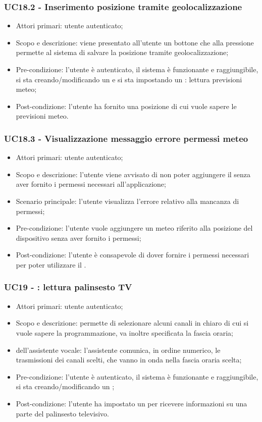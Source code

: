 \subsubsection{UC18.2 - Inserimento posizione tramite geolocalizzazione}
\begin{itemize}
	\item  Attori primari: utente autenticato;
	\item  Scopo e descrizione: viene presentato all'utente un bottone che alla pressione permette al sistema di salvare la posizione tramite geolocalizzazione;
	\item  Pre-condizione: l'utente è autenticato, il sistema è funzionante e raggiungibile, si sta creando/modificando un  e si sta impostando un : lettura previsioni meteo;
	\item  Post-condizione: l'utente ha fornito una posizione di cui vuole sapere le previsioni meteo.
\end{itemize}
\subsubsection{UC18.3 - Visualizzazione messaggio errore permessi meteo}
\begin{itemize}
	\item  Attori primari: utente autenticato;
	\item  Scopo e descrizione: l'utente viene avvisato di non poter aggiungere il  senza aver fornito i permessi necessari all'applicazione;
	\item  Scenario principale: l'utente visualizza l'errore relativo alla mancanza di permessi;
	\item  Pre-condizione: l'utente vuole aggiungere un  meteo riferito alla posizione del dispositivo  senza aver fornito i permessi;
	\item  Post-condizione: l'utente è consapevole di dover fornire i permessi necessari per poter utilizzare il .
\end{itemize}
\subsubsection{UC19 - : lettura palinsesto TV}
\begin{itemize}
	\item  Attori primari: utente autenticato;
	\item  Scopo e descrizione: permette di selezionare alcuni canali in chiaro di cui si vuole sapere la programmazione, va inoltre specificata la fascia oraria;
	\item  {} dell'assistente vocale: l'assistente comunica, in ordine numerico, le trasmissioni dei canali scelti, che vanno in onda nella fascia oraria scelta;
	\item  Pre-condizione: l'utente è autenticato, il sistema è funzionante e raggiungibile, si sta creando/modificando un ;
	\item  Post-condizione: l'utente ha impostato un  per ricevere informazioni su una parte del palinsesto televisivo.
\end{itemize}
